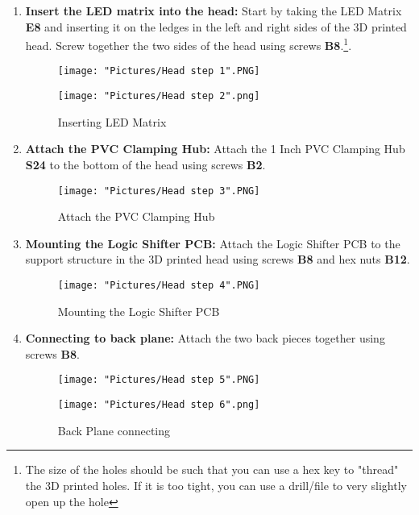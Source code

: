 \documentclass[12pt]{article}
\begin{document}
\begin{enumerate}

	\item \textbf{Insert the LED matrix into the head:} Start by taking the LED Matrix \textbf{E8} and inserting it on the ledges in the left and right sides of the 3D printed head. Screw together the two sides of the head using screws \textbf{B8}.\footnote{The size of the holes should be such that you can use a hex key to "thread" the 3D printed holes. If it is too tight, you can use a drill/file to very slightly open up the hole}.


\begin{figure}[H]
	\centering
  	\begin{minipage}[b]{0.45\textwidth}
		\texttt{[image: "Pictures/Head step 1".PNG]}
  	\end{minipage}
  	\hfill
  	\begin{minipage}[b]{0.45\textwidth}
    		\texttt{[image: "Pictures/Head step 2".png]}
  	\end{minipage}
  	\caption{Inserting LED Matrix}
  	\label{LED}
\end{figure}

	\item \textbf{Attach the PVC  Clamping Hub:} Attach the 1 Inch PVC Clamping Hub \textbf{S24} to the bottom of the head using screws \textbf{B2}.

\begin{figure}[H]
	\centering
	\texttt{[image: "Pictures/Head step 3".PNG]}
	\caption{Attach the PVC Clamping Hub}
\end{figure}

	\item \textbf{Mounting the Logic Shifter PCB:} Attach the Logic Shifter PCB to the support structure in the 3D printed head using screws \textbf{B8} and hex nuts \textbf{B12}.

\begin{figure}[H]
	\centering
	\texttt{[image: "Pictures/Head step 4".PNG]}
	\caption{Mounting the Logic Shifter PCB}
\end{figure}

	\item \textbf{Connecting to back plane:} Attach the two back pieces together using screws \textbf{B8}.

\begin{figure}[H]
	\centering
  	\begin{minipage}[b]{0.45\textwidth}
		\texttt{[image: "Pictures/Head step 5".PNG]}
  	\end{minipage}
  	\hfill
  	\begin{minipage}[b]{0.45\textwidth}
    		\texttt{[image: "Pictures/Head step 6".png]}
  	\end{minipage}
  	\caption{Back Plane connecting}
  	\label{back}
\end{figure}


\end{enumerate}
\end{document}

